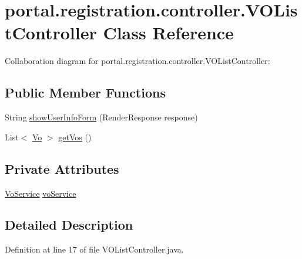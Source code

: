 \hypertarget{classportal_1_1registration_1_1controller_1_1VOListController}{
\section{portal.registration.controller.VOListController Class Reference}
\label{classportal_1_1registration_1_1controller_1_1VOListController}
}


Collaboration diagram for portal.registration.controller.VOListController:
\subsection*{Public Member Functions}
\begin{DoxyCompactItemize}
\item 
String \hyperlink{classportal_1_1registration_1_1controller_1_1VOListController_a2190dd57ef91af84c36317c941ccec4f}{showUserInfoForm} (RenderResponse response)
\item 
List$<$ \hyperlink{classportal_1_1registration_1_1domain_1_1Vo}{Vo} $>$ \hyperlink{classportal_1_1registration_1_1controller_1_1VOListController_ab3008c4ba7e69cf6fd5d291c59d27a73}{getVos} ()
\end{DoxyCompactItemize}
\subsection*{Private Attributes}
\begin{DoxyCompactItemize}
\item 
\hyperlink{interfaceportal_1_1registration_1_1services_1_1VoService}{VoService} \hyperlink{classportal_1_1registration_1_1controller_1_1VOListController_a8bae931aec8ab793ebbd739ce4211171}{voService}
\end{DoxyCompactItemize}


\subsection{Detailed Description}


Definition at line 17 of file VOListController.java.



